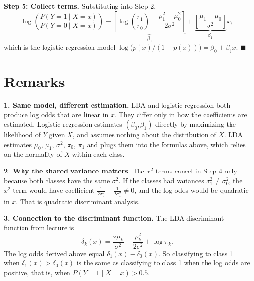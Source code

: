 \documentclass[11pt]{article}
\begin{document}
\textbf{Step 5: Collect terms.}
Substituting into Step 2,
\[
\log\!\left( \frac{P(Y = 1 \mid X = x)}{P(Y = 0 \mid X = x)} \right)
= \underbrace{\left[ \log\!\left(\frac{\pi_1}{\pi_0}\right) - \frac{\mu_1^2 - \mu_0^2}{2\sigma^2} \right]}_{\beta_0}
+ \underbrace{\left[ \frac{\mu_1 - \mu_0}{\sigma^2} \right]}_{\beta_1} x ,
\]
which is the logistic regression model $\log\!\big(p(x)/(1 - p(x))\big) = \beta_0 + \beta_1 x$. \hfill $\blacksquare$

\section*{Remarks}

\textbf{1. Same model, different estimation.}
LDA and logistic regression both produce log odds that are linear in $x$. They differ only in how the coefficients are estimated. Logistic regression estimates $(\beta_0, \beta_1)$ directly by maximizing the likelihood of $Y$ given $X$, and assumes nothing about the distribution of $X$. LDA estimates $\mu_0$, $\mu_1$, $\sigma^2$, $\pi_0$, $\pi_1$ and plugs them into the formulas above, which relies on the normality of $X$ within each class.

\textbf{2. Why the shared variance matters.}
The $x^2$ terms cancel in Step 4 only because both classes have the same $\sigma^2$. If the classes had variances $\sigma_1^2 \neq \sigma_0^2$, the $x^2$ term would have coefficient $\frac{1}{2\sigma_0^2} - \frac{1}{2\sigma_1^2} \neq 0$, and the log odds would be quadratic in $x$. That is quadratic discriminant analysis.

\textbf{3. Connection to the discriminant function.}
The LDA discriminant function from lecture is
\[
\delta_k(x) = \frac{x \mu_k}{\sigma^2} - \frac{\mu_k^2}{2\sigma^2} + \log \pi_k .
\]
The log odds derived above equal $\delta_1(x) - \delta_0(x)$. So classifying to class 1 when $\delta_1(x) > \delta_0(x)$ is the same as classifying to class 1 when the log odds are positive, that is, when $P(Y = 1 \mid X = x) > 0.5$.
\end{document}
